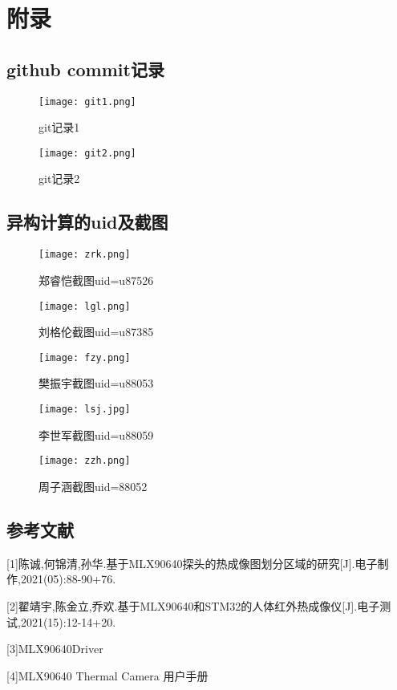 \appendix
\chapter*{附录}
\section*{github commit记录}
\begin{figure}[htbp]
    \centering
    \texttt{[image: git1.png]}
    \caption{git记录1}\label{fig:git1}
    \vspace{\baselineskip}
    \end{figure}
    \begin{figure}[htbp]
        \centering
        \texttt{[image: git2.png]}
        \caption{git记录2}\label{fig:git2}
        \vspace{\baselineskip}
        \end{figure} 
      
    \clearpage
\section*{异构计算的uid及截图}

\begin{figure}[htbp]
\centering
\texttt{[image: zrk.png]}
\caption{郑睿恺截图uid=u87526}\label{fig:zrk}
\vspace{\baselineskip}
\end{figure}
\begin{figure}[h]
\centering
\texttt{[image: lgl.png]}
\caption{刘格伦截图uid=u87385}\label{fig:lgl}
\vspace{\baselineskip}
\end{figure}
\begin{figure}[h]
\centering
\texttt{[image: fzy.png]}
\caption{樊振宇截图uid=u88053}\label{fig:fzy}
\vspace{\baselineskip}
\end{figure}    
\begin{figure}[h]
\centering
\texttt{[image: lsj.jpg]}
\caption{李世军截图uid=u88059}\label{fig:lsj}
\vspace{\baselineskip}
\end{figure}
\begin{figure}[h]
\centering
\texttt{[image: zzh.png]}
\caption{周子涵截图uid=88052}\label{fig:zzh}
\vspace{\baselineskip}
\end{figure}
\clearpage
\section*{参考文献}
[1]陈诚,何锦清,孙华.基于MLX90640探头的热成像图划分区域的研究[J].电子制作,2021(05):88-90+76.

[2]翟靖宇,陈金立,乔欢.基于MLX90640和STM32的人体红外热成像仪[J].电子测试,2021(15):12-14+20.

[3]MLX90640Driver

[4]MLX90640 Thermal Camera 用户手册




